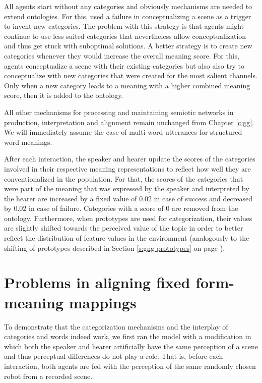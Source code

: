  All agents start without any
categories and obviously mechanisms are needed to extend
ontologies. For this, \cite{steels99situated} used a failure in
conceptualizing a scene as a trigger to invent new categories. The
problem with this strategy is that agents might continue to use less
suited categories that nevertheless allow conceptualization and thus
get stuck with suboptimal solutions.  A better strategy is to create
new categories whenever they would increase the overall meaning
score. For this, agents conceptualize a scene with their existing
categories but also also try to conceptualize with new categories that
were created for the most salient channels. Only when a new category
leads to a meaning with a higher combined meaning score, then it is
added to the ontology.

 All other
mechanisms for processing and maintaining semiotic networks in
production, interpretation and alignment remain unchanged from Chapter
\ref{c:gg}. We will immediately assume the case of multi-word
utterances for structured word meanings.


 After each interaction, the speaker
and hearer update the scores of the categories involved in their
respective meaning representations to reflect how well they are
conventionalized in the population. For that, the scores of the
categories that were part of the meaning that was expressed by the
speaker and interpreted by the hearer are increased by a fixed value
of $0.02$ in case of success and decreased by $0.02$ in case of
failure. Categories with a score of $0$ are removed from the
ontology. Furthermore, when prototypes are used for categorization,
their values are slightly shifted towards the perceived value of the
topic in order to better reflect the distribution of feature values in
the environment (analogously to the shifting of prototypes described
in Section \ref{s:gng-prototypes} on page \pageref{s:gng-prototypes}).


\section{Problems in aligning fixed form-meaning mappings}

To demonstrate that the categorization mechanisms and the interplay of
categories and words indeed work, we first ran the model with a
modification in which both the speaker and hearer artificially have
the same perception of a scene and thus perceptual differences do not
play a role. That is, before each interaction, both agents are fed
with the perception of the same randomly chosen robot from a recorded
scene.

